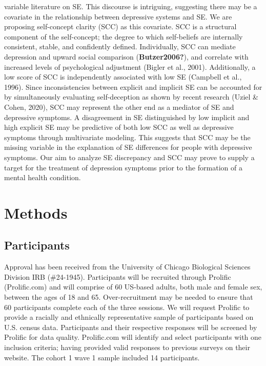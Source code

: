 \documentclass[
]{article}
\begin{document}
variable literature on SE. This discourse is intriguing, suggesting
there may be a covariate in the relationship between depressive systems
and SE. We are proposing self-concept clarity (SCC) as this covariate.
SCC is a structural component of the self-concept; the degree to which
self-beliefs are internally consistent, stable, and confidently defined.
Individually, SCC can mediate depression and upward social comparison
(\textbf{Butzer2006?}), and correlate with increased levels of
psychological adjustment (Bigler et al., 2001). Additionally, a low
score of SCC is independently associated with low SE (Campbell et al.,
1996). Since inconsistencies between explicit and implicit SE can be
accounted for by simultaneously evaluating self-deception as shown by
recent research (Uziel \& Cohen, 2020), SCC may represent the other end
as a mediator of SE and depressive symptoms. A disagreement in SE
distinguished by low implicit and high explicit SE may be predictive of
both low SCC as well as depressive symptoms through multivariate
modeling. This suggests that SCC may be the missing variable in the
explanation of SE differences for people with depressive symptoms. Our
aim to analyze SE discrepancy and SCC may prove to supply a target for
the treatment of depression symptoms prior to the formation of a mental
health condition.

\section{Methods}\label{methods}

\subsection{Participants}\label{participants}

Approval has been received from the University of Chicago Biological
Sciences Division IRB (\#24-1945). Participants will be recruited
through Prolific (Prolific.com) and will comprise of 60 US-based adults,
both male and female sex, between the ages of 18 and 65.
Over-recruitment may be needed to ensure that 60 participants complete
each of the three sessions. We will request Prolific to provide a
racially and ethnically representative sample of participants based on
U.S. census data. Participants and their respective responses will be
screened by Prolific for data quality. Prolific.com will identify and
select participants with one inclusion criteria; having provided valid
responses to previous surveys on their website. The cohort 1 wave 1
sample included 14 participants.
\end{document}
